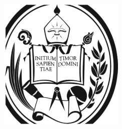 \begin{titlepage}

\begin{addmargin}[-1cm]{-3cm}
\begin{center}
\large

\hfill
\vfill

\begingroup
\color{Maroon}\spacedallcaps{\myTitle} \\ \bigskip
\mySubtitle \\ \medskip
\endgroup

\spacedlowsmallcaps{\myName}

\vfill

\includegraphics[width=6cm]{figures/ula-negro} \\ \medskip

\myDepartment \\
\myFaculty \\
\myUni \\ \bigskip


\vfill

\end{center}
\end{addmargin}

\end{titlepage}
